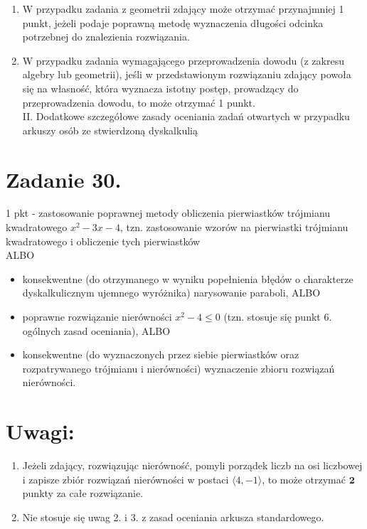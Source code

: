 \documentclass[10pt]{article}
\begin{document}
\begin{enumerate}
  \item W przypadku zadania z geometrii zdający może otrzymać przynajmniej 1 punkt, jeżeli podaje poprawną metodę wyznaczenia długości odcinka potrzebnej do znalezienia rozwiązania.
  \item W przypadku zadania wymagającego przeprowadzenia dowodu (z zakresu algebry lub geometrii), jeśli w przedstawionym rozwiązaniu zdający powoła się na własność, która wyznacza istotny postęp, prowadzący do przeprowadzenia dowodu, to może otrzymać 1 punkt.\\
II. Dodatkowe szczegółowe zasady oceniania zadań otwartych w przypadku arkuszy osób ze stwierdzoną dyskalkulią
\end{enumerate}

\section*{Zadanie 30.}
1 pkt - zastosowanie poprawnej metody obliczenia pierwiastków trójmianu kwadratowego $x^{2}-3 x-4$, tzn. zastosowanie wzorów na pierwiastki trójmianu kwadratowego i obliczenie tych pierwiastków\\
ALBO

\begin{itemize}
  \item konsekwentne (do otrzymanego w wyniku popełnienia błędów o charakterze dyskalkulicznym ujemnego wyróżnika) narysowanie paraboli, ALBO
  \item poprawne rozwiązanie nierówności $x^{2}-4 \leq 0$ (tzn. stosuje się punkt 6. ogólnych zasad oceniania), ALBO
  \item konsekwentne (do wyznaczonych przez siebie pierwiastków oraz rozpatrywanego trójmianu i nierówności) wyznaczenie zbioru rozwiązań nierówności.
\end{itemize}

\section*{Uwagi:}
\begin{enumerate}
  \item Jeżeli zdający, rozwiązując nierówność, pomyli porządek liczb na osi liczbowej i zapisze zbiór rozwiązań nierówności w postaci $\langle 4,-1\rangle$, to może otrzymać $\mathbf{2}$ punkty za całe rozwiązanie.
  \item Nie stosuje się uwag 2. i 3. z zasad oceniania arkusza standardowego.
\end{enumerate}
\end{document}
